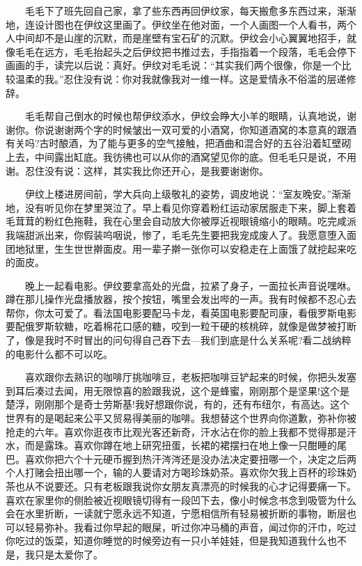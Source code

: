 \documentclass[12pt,UTF8]{ctexbook}
\begin{document}
　　毛毛下了班先回自己家，拿了些东西再回伊纹家，每天搬愈多东西过来，渐渐地，连设计图也在伊纹这里画了。伊纹坐在他对面，一个人画图一个人看书，两个人中间却不是山崖的沉默，而是崖壁有宝石矿的沉默。伊纹会小心翼翼地招手，就像毛毛在远方，毛毛抬起头之后伊纹把书推过去，手指指着一个段落，毛毛会停下画画的手，读完以后说：真好。伊纹对毛毛说：\enquote{其实我们两个很像，你是一个比较温柔的我。}忍住没有说：你对我就像我对一维一样。这是爱情永不俗滥的层递修辞。

　　毛毛帮自己倒水的时候也帮伊纹添水，伊纹会睁大小羊的眼睛，认真地说，谢谢你。你说谢谢两个字的时候皱出一双可爱的小酒窝，你知道酒窝的本意真的跟酒有关吗?古时酿酒，为了能与更多的空气接触，把酒曲和混合好的五谷沿着缸壁砌上去，中间露出缸底。我彷彿也可以从你的酒窝望见你的底。但毛毛只是说，不用谢。忍住没有说：这样，其实我比你还开心，是我要谢谢你。

　　伊纹上楼进房间前，学大兵向上级敬礼的姿势，调皮地说：\enquote{室友晚安。}渐渐地，没有听见你在梦里哭泣了。早上看见你穿着粉红运动家居服走下来，脚上套着毛茸茸的粉红色拖鞋，我在心里会自动放大你被厚近视眼镜缩小的眼睛。吃完咸派我端甜派出来，你假装呜咽说，惨了，毛毛先生要把我宠成废人了。我愿意堕入面团地狱里，生生世世擀面皮。用一辈子擀一张你可以安稳走在上面饿了就挖起来吃的面皮。

　　晚上一起看电影。伊纹要拿高处的光盘，拉紧了身子，一面拉长声音说嘿咻。蹲在那儿操作光盘播放器，按个按钮，嘴里会发出哔的一声。我有时候都不忍心去帮你，你太可爱了。看法国电影要配马卡龙，看英国电影要配司康，看俄罗斯电影要配俄罗斯软糖，吃着棉花口感的糖，咬到一粒干硬的核桃碎，就像是做梦被打断了，像是我时不时冒出的问句得自己吞下去---我们到底是什么关系呢?看二战纳粹的电影什么都不可以吃。

　　喜欢跟你去熟识的咖啡厅挑咖啡豆，老板把咖啡豆铲起来的时候，你把头发塞到耳后凑过去闻，用无限惊喜的脸跟我说，这个是蜂蜜，刚刚那个是坚果!这个是楚浮，刚刚那个是奇士劳斯基!我好想跟你说，有的，还有布纽尔，有高达。这个世界有的是喝起来公平又贸易得美丽的咖啡。我想替这个世界向你道歉，弥补你被抢走的六年。喜欢你逛夜市比观光客还新奇，汗水沾在你的脸上我都不觉得那是汗水，而是露珠。喜欢你蹲在地上研究扭蛋，长裙的裙摆扫在地上像一只酣睡的尾巴。喜欢你把六个十元硬币握到热汗涔涔还是没办法决定要扭哪一个，决定之后两个人打赌会扭出哪一个，输的人要请对方喝珍珠奶茶。喜欢你欠我上百杯的珍珠奶茶也从不说要还。只有老板跟我说你女朋友真漂亮的时候我的心才记得要痛一下。喜欢在家里你的侧脸被近视眼镜切得有一段凹下去，像小时候念书念到吸管为什么会在水里折断，一读就宁愿永远不知道，宁愿相信所有轻易被折断的事物，断层也可以轻易弥补。我看过你早起的眼屎，听过你冲马桶的声音，闻过你的汗巾，吃过你吃过的饭菜，知道你睡觉的时候旁边有一只小羊娃娃，但是我知道我什么也不是，我只是太爱你了。
\end{document}

